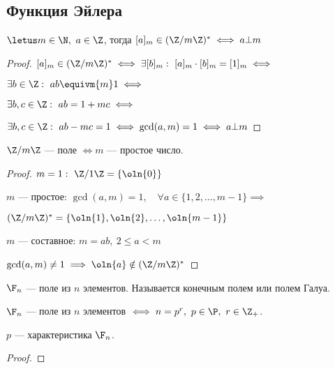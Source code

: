 \subsection{Функция Эйлера}

\begin{theorem-non}
    $\letus m \in \N,~ a \in \Z$, тогда $[a]_m \in (\Z/m\Z)^* \iff a \bot m$
\end{theorem-non}

\begin{proof}
    
    $[a]_m \in (\Z/m\Z)^* \iff \exists [b]_m:~[a]_m \cdot [b]_m = [1]_m \iff$
    
    $\exists b \in \Z:~ab \equivm{m} 1 \iff$
    
    $\exists b, c \in \Z:~ab = 1 + mc \iff$
    
    $\exists b, c \in \Z:~ab - mc = 1 \iff \gcd(a, m) = 1 \iff a \bot m$
\end{proof}

\begin{follow}
    $\Z/m\Z$ --- поле $\iff m$ --- простое число.
\end{follow}

\begin{proof}

    $m = 1:\ \Z/1\Z = \{\oln{0}\}$
    
    $m$ --- простое: $\gcd(a, m) = 1, \quad \forall a \in \{1, 2, \ldots, m-1\} \implies$
    
    $(\Z/m\Z)^* = \{\oln{1}, \oln{2}, \ldots, \oln{m-1}\}$
    
    $m$ --- составное: $m = ab,~2 \leq a < m$
    
    $\gcd(a, m) \neq 1 \implies \oln{a} \notin (\Z/m\Z)^*$
\end{proof}

\begin{defn}
    $\F_{n}$ --- поле из $n$ элементов. Называется конечным полем или полем Галуа.
\end{defn}

\begin{theorem-non}
    $\F_{n}$ --- поле из $n$ элементов $\iff n = p^r,~ p \in \P,~ r \in \Z_{+}$.

    $p$ --- характеристика $\F_{n}$.
\end{theorem-non}

\begin{proof}
\end{proof}

